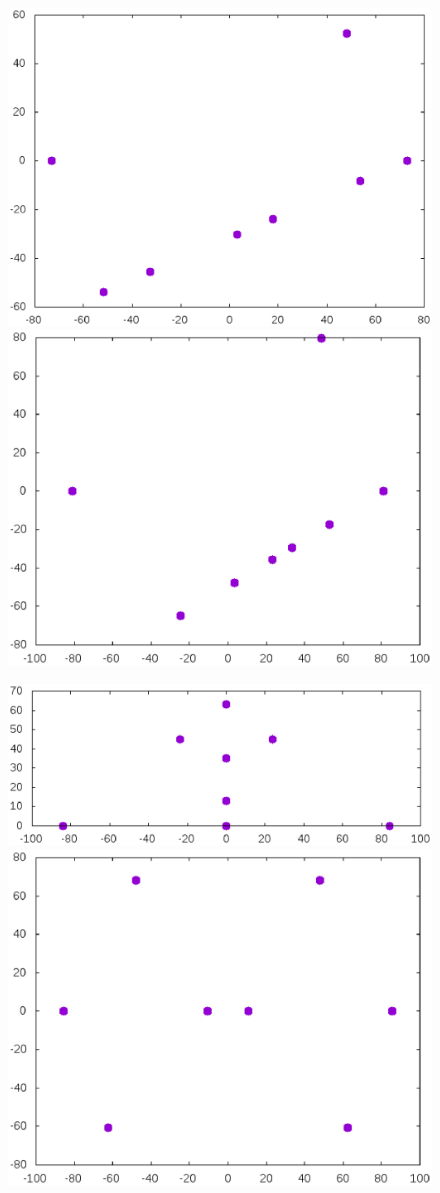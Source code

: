 \documentclass[12pt]{article}
\begin{document}
\begin{itemize}
\begin{figure}[htbp]
	\includegraphics[width=.48\linewidth]{Avdeev_8_146_1538486493354.eps}
	\hfill
	\includegraphics[width=.48\linewidth]{Avdeev_8_162_1538488466583.eps}
	\\
	\parbox{.48\linewidth}{\caption{}\label{Avdeev_8_146_1538486493354.eps}}
	\hfill
	\parbox{.48\linewidth}{\caption{}\label{Avdeev_8_162_1538488466583.eps}}
\end{figure}




\begin{figure}[htbp]
	\includegraphics[width=.48\linewidth]{Avdeev_8_168_1538490487450.eps}
	\hfill
	\includegraphics[width=.48\linewidth]{Avdeev_8_171_1538491142044.eps}
	\\
	\parbox{.48\linewidth}{\caption{}\label{Avdeev_8_168_1538490487450.eps}}
	\hfill
	\parbox{.48\linewidth}{\caption{}\label{Avdeev_8_171_1538491142044.eps}}
\end{figure}










\end{itemize}
\end{document}
